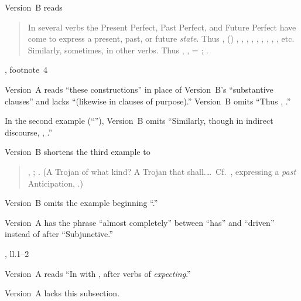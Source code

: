 \begin{variations}
Version~B reads
\begin{quote}
In several verbs the Present Perfect, Past Perfect, and Future Perfect
have come to express a present, past, or future \emph{state}.  Thus
, () ,
, , ,
, , , ,
, etc.  Similarly, sometimes, in other verbs.  Thus
, , = ; .
\end{quote}

\item[{\xref[3, \emph{a})]{502}, footnote~4}]

Version~A reads “these constructions” in place of Version~B's
“substantive clauses” and lacks “(likewise in clauses of purpose).”
Version~B omits “Thus , .”

\item[{\xref[1]{507}}]

In the second example (“\ellipsis”), Version~B
omits “Similarly, though in indirect discourse, , .”

Version~B shortens the third example to
\begin{quote}
,
;
.  (A Trojan of what kind?  A Trojan that
shall.\dots\ Cf.\ , expressing a \emph{past}
Anticipation, .)
\end{quote}

Version~B omits the example beginning “.”

\item[{\xref[\emph{a}]{507}}]

Version~A has the phrase “almost completely” between “has” and
“driven” instead of after “Subjunctive.”

\item[{\xref[2]{507}, ll.1–2}]

Version~A reads “In  with , after
verbs of \emph{expecting}.”

\item[{\xref[2, \emph{b}]{507}}]

Version~A lacks this subsection.


\end{variations}
